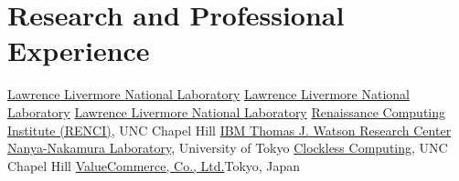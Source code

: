 \section{Research and Professional Experience}
		{\href{http://www.llnl.gov}{Lawrence Livermore National Laboratory}}{}{}
		{\href{http://www.llnl.gov}{Lawrence Livermore National Laboratory}}{}{}
		{\href{http://www.llnl.gov}{Lawrence Livermore National Laboratory}}{}{}
		{\href{http://www.renci.org}{Renaissance Computing Institute (RENCI)}, UNC Chapel Hill}{}{}{}
		{\href{http://www.watson.ibm.com}{IBM Thomas J. Watson Research Center}}{}{}{}
		{\href{http://www.hal.rcast.u-tokyo.ac.jp/}{Nanya-Nakamura Laboratory}, University of Tokyo}{}{}{}
		{\href{http://www.cs.unc.edu/~montek/}{Clockless Computing}, UNC Chapel Hill}{}{}{}
		{\href{http://valuecommerce.com}{ValueCommerce, Co., Ltd.}}{Tokyo, Japan}{}{}

